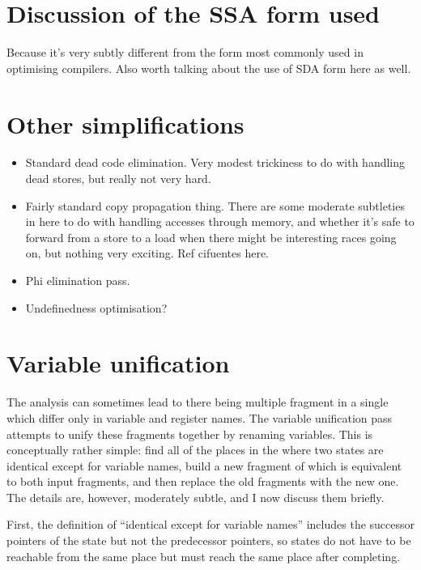 \section{Discussion of the SSA form used}
Because it's very subtly different from the form most commonly used in optimising compilers.
Also worth talking about the use of SDA form here as well.

\section{Other simplifications}

\begin{itemize}
\item
  Standard dead code elimination.  Very modest trickiness to do with
  handling dead stores, but really not very hard.
\item
  Fairly standard copy propagation thing.  There are some moderate
  subtleties in here to do with handling accesses through memory, and
  whether it's safe to forward from a store to a load when there might
  be interesting races going on, but nothing very exciting.  Ref
  cifuentes here.
\item
  Phi elimination pass.
\item
  Undefinedness optimisation?
\end{itemize}

\section{Variable unification}

The analysis can sometimes lead to there being multiple fragment in a
single \StateMachine which differ only in variable and register names.
The variable unification pass attempts to unify these fragments
together by renaming variables.  This is conceptually rather simple:
find all of the places in the \StateMachine where two states are
identical except for variable names, build a new fragment of
\StateMachine which is equivalent to both input fragments, and then
replace the old fragments with the new one.  The details are, however,
moderately subtle, and I now discuss them briefly.

First, the definition of ``identical except for variable names''
includes the successor pointers of the state but not the predecessor
pointers, so states do not have to be reachable from the same place
but must reach the same place after completing.

